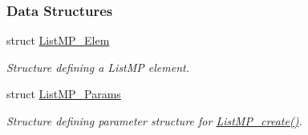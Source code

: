 \subsubsection*{Data Structures}
\begin{DoxyCompactItemize}
\item 
struct \hyperlink{struct_list_m_p___elem}{List\-M\-P\-\_\-\-Elem}
\begin{DoxyCompactList}\small\item\em Structure defining a List\-M\-P element. \end{DoxyCompactList}\item 
struct \hyperlink{struct_list_m_p___params}{List\-M\-P\-\_\-\-Params}
\begin{DoxyCompactList}\small\item\em Structure defining parameter structure for \hyperlink{_list_m_p_8h_a71fdd7f30d377065fb70dd095a186d3e}{List\-M\-P\-\_\-create()}. \end{DoxyCompactList}\end{DoxyCompactItemize}
